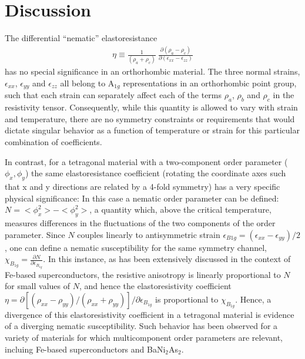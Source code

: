 \documentclass[%
 reprint, %
amsmath,amssymb,
aps,
]{revtex4-2}
\begin{document}
\section{Discussion}
The differential ``nematic'' elastoresistance
\begin{align}
    \eta \equiv \frac 1 {(\rho_a+\rho_c)} \ \frac {\partial (\rho_a-\rho_c)}{\partial (\epsilon_{xx}-\epsilon_{zz})}
    \label{eta}
\end{align}
has no special significance in an orthorhombic material. The three normal strains, $\epsilon_{xx}$, $\epsilon_{yy}$ and $\epsilon_{zz}$ all belong to A$_{1g}$ representations in an orthorhombic point group, such that each strain can separately affect each of the terms $\rho_a$, $\rho_b$ and $\rho_c$ in the resistivity tensor. Consequently, while this quantity is allowed to vary with strain and temperature, there are no symmetry constraints or requirements that would dictate singular behavior as a function of temperature or strain for this particular combination of coefficients. 

In contrast, for a tetragonal material with a two-component order parameter ($\phi_x,\phi_y$) the same elastoresistance coefficient (rotating the coordinate axes such that x and y directions are related by a 4-fold symmetry) has a very specific physical significance: In this case a nematic order parameter can be defined: $N = <\phi_x^2> - <\phi_y^2>$, a quantity which, above the critical temperature, measures differences in the fluctuations of the two components of the order parameter. Since $N$ couples linearly to antisymmetric strain $\epsilon_{B1g}=(\epsilon_{xx}-\epsilon_{yy})/2$, one can define a nematic susceptibility for the same symmetry channel, $\chi_{B_{1g}} = \frac{\partial N}{\partial \epsilon_{B_{1g}}}$. In this instance, as has been extensively discussed in the context of Fe-based superconductors,\cite{Chu2012}\cite{Shapiro2015} \cite{Kuo2016} the resistive anisotropy is linearly proportional to $N$ for small values of $N$, and hence the elastoresistivity coefficient $\eta =\partial [(\rho_{xx}-\rho_{yy})/(\rho_{xx}+\rho_{yy})]/\partial \epsilon_{B_{1g}}$ is proportional to $\chi_{B_{1g}}$.\cite{Shapiro2015} Hence, a divergence of this elastoresistivity coefficient in a tetragonal material is evidence of a diverging nematic susceptibility. Such behavior has been observed for a variety of materials for which multicomponent order parameters are relevant, incluing Fe-based superconductors and BaNi$_2$As$_2$.\cite{Chu2012}\cite{Eckberg202}    
\end{document}
